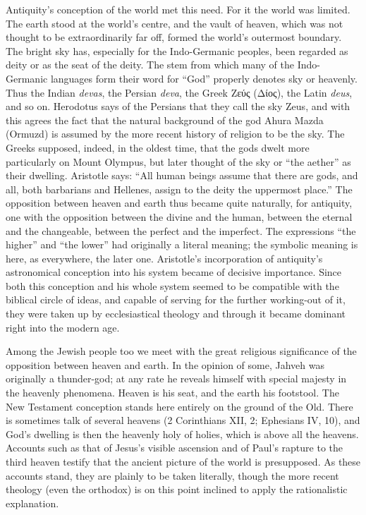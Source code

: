 \documentclass[12pt,a4paper]{book}
\newcommand{\opage}[1]{\marginnote{\footnotesize\textit{[#1]}}}
\begin{document}
Antiquity's conception of the world met this need. For it the world was
limited. The earth stood at the world's centre, and the vault of heaven,
which was not thought to be extraordinarily far off, formed the world's
outermost boundary. The bright sky has, especially for the Indo-Germanic
peoples, been regarded as deity or as the seat of the deity. The stem from
which many of the Indo-Germanic languages form their word for ``God''
properly denotes sky or heavenly. Thus the Indian \textit{devas}, the Persian
\textit{deva}, the Greek Ζεύς (Δίος), the Latin \textit{deus}, and so on.
Herodotus says of the Persians that they call the sky Zeus, and with this
agrees the fact that the natural background of the god Ahura Mazda (Ormuzd)
is assumed by the more recent history of religion to be the sky. The Greeks
supposed, indeed, in the oldest time, that the gods dwelt more particularly
on Mount Olympus, but later thought of the sky or ``the aether'' as their
dwelling. Aristotle says: ``All human beings assume that there are gods, and
all, both barbarians and Hellenes, assign to the deity the uppermost place.''
The opposition between heaven and earth thus became quite naturally, for
antiquity, one with the opposition between the divine and the human, between
the eternal and the changeable, between the perfect and the imperfect. The
expressions ``the higher'' and ``the lower'' had originally a literal
meaning; the symbolic meaning is here, as everywhere, the later one.
Aristotle's incorporation of antiquity's astronomical conception into his
system became of decisive importance. Since both this conception and his
whole system seemed to be compatible with the biblical 
\opage{25}circle of ideas, and
capable of serving for the further working-out of it, they were taken up by
ecclesiastical theology and through it became dominant right into the modern
age.

Among the Jewish people too we meet with the great religious significance of
the opposition between heaven and earth. In the opinion of some, Jahveh was
originally a thunder-god; at any rate he reveals himself with special majesty
in the heavenly phenomena. Heaven is his seat, and the earth his footstool.
The New Testament conception stands here entirely on the ground of the Old.
There is sometimes talk of several heavens (2 Corinthians XII, 2; Ephesians
IV, 10), and God's dwelling is then the heavenly holy of holies, which is
above all the heavens. Accounts such as that of Jesus's visible ascension and
of Paul's rapture to the third heaven testify that the ancient picture of the
world is presupposed. As these accounts stand, they are plainly to be taken
literally, though the more recent theology (even the orthodox) is on this
point inclined to apply the rationalistic explanation.
\end{document}
